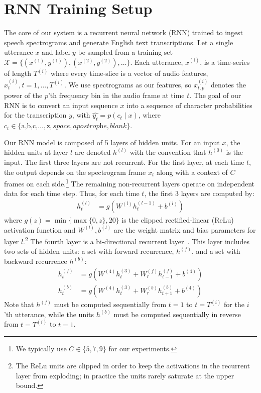 \section{RNN Training Setup}
\label{sec:deepspeech:model}

The core of our system is a recurrent neural network (RNN) trained to ingest
speech spectrograms and generate English text transcriptions. Let a single
utterance $x$ and label $y$ be sampled from a training set $\mathcal{X} =
\{(x^{(1)},y^{(1)}),(x^{(2)},y^{(2)}),\ldots\}$. Each utterance, $x^{(i)}$, is
a time-series of length $T^{(i)}$ where every time-slice is a vector of audio
features, $x_t^{(i)}, t=1,\ldots,T^{(i)}$. We use spectrograms as our features,
so $x^{(i)}_{t,p}$ denotes the power of the $p$'th frequency bin in the audio
frame at time $t$. The goal of our RNN is to convert an input sequence $x$ into
a sequence of character probabilities for the transcription $y$, with
$\hat{y_t} = p(c_t \mid x)$, where $c_t \in \{\textrm{a,b,c,}\ldots,\textrm{z},
\textit{space},\textit{apostrophe},\textit{blank}\}$.

Our RNN model is composed of 5 layers of hidden units.  For an input $x$, the
hidden units at layer $l$ are denoted $h^{(l)}$ with the convention that
$h^{(0)}$ is the input. The first three layers are not recurrent. For the first
layer, at each time $t$, the output depends on the spectrogram frame $x_t$
along with a context of $C$ frames on each side.\footnote{We typically use
$C\in \{5, 7, 9\}$ for our experiments.} The remaining non-recurrent layers
operate on independent data for each time step. Thus, for each time $t$, the
first 3 layers are computed by:
\begin{align*}
    h^{(l)}_t &= g(W^{(l)} h^{(l-1)}_t + b^{(l)})
\end{align*}
where $g(z) = \min\{\max\{0,z\}, 20\}$ is the clipped rectified-linear (ReLu)
activation function and $W^{(l)}, b^{(l)}$ are the weight matrix and bias
parameters for layer $l$.\footnote{The ReLu units are clipped in order to keep
the activations in the recurrent layer from exploding; in practice the units
rarely saturate at the upper bound.} The fourth layer is a bi-directional
recurrent layer~\cite{schuster1997bidirectional}. This layer includes two sets
of hidden units: a set with forward recurrence, $h^{(f)}$, and a set with
backward recurrence $h^{(b)}$:
\begin{align*}
    h^{(f)}_t &= g(W^{(4)} h^{(3)}_t + W_r^{(f)} h^{(f)}_{t-1} + b^{(4)}) \\
    h^{(b)}_t &= g(W^{(4)} h^{(3)}_t + W_r^{(b)} h^{(b)}_{t+1} + b^{(4)})
\end{align*}
Note that $h^{(f)}$ must be computed sequentially from $t=1$ to $t=T^{(i)}$ for
the $i$'th utterance, while the units $h^{(b)}$ must be computed sequentially
in reverse from $t=T^{(i)}$ to $t=1$.

